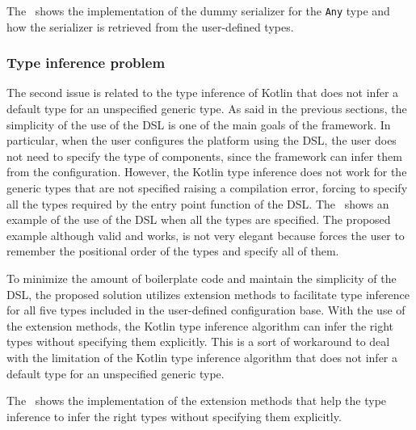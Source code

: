 The~ shows the implementation of the dummy serializer for the \texttt{Any} type and how the serializer is retrieved from the
user-defined types.



\subsubsection{Type inference problem}

The second issue is related to the type inference of Kotlin that does not infer a default type for an unspecified generic type.
As said in the previous sections, the simplicity of the use of the DSL is one of the main goals of the framework. In particular, when the user
configures the platform using the DSL, the user does not need to specify the type of components, since the framework can infer them from the
configuration. However, the Kotlin type inference does not work for the generic types that are not specified raising a compilation error, forcing
to specify all the types required by the entry point function of the DSL. The~ shows an example of the use of the
DSL when all the types are specified. The proposed example although valid and works, is not very elegant because forces the user to remember
the positional order of the types and specify all of them.

To minimize the amount of boilerplate code and maintain the simplicity of the DSL, the proposed solution utilizes extension methods to
facilitate type inference for all five types included in the user-defined configuration base.
With the use of the extension methods, the Kotlin type inference algorithm can infer the right types without specifying them explicitly.
This is a sort of workaround to deal with the limitation of the Kotlin type inference algorithm that does not infer a default type for an
unspecified generic type.



The~ shows the implementation of the extension methods that help the type inference to infer the
right types without specifying them explicitly.


